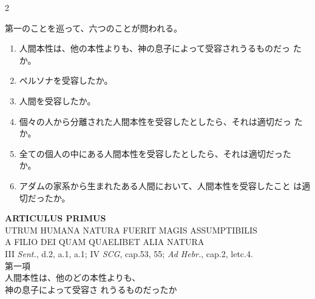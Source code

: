 \documentclass[paper=a4paper,fontsize=10pt,jafontsize=9pt,titlepage]{jlreq}
\begin{document}
\begin{paracol}{2}
\switchcolumn

第一のことを巡って、六つのことが問われる。
\begin{enumerate}
 \item 人間本性は、他の本性よりも、神の息子によって受容されうるものだっ
       たか。
 \item ペルソナを受容したか。
 \item 人間を受容したか。
 \item 個々の人から分離された人間本性を受容したとしたら、それは適切だっ
       たか。
 \item 全ての個人の中にある人間本性を受容したとしたら、それは適切だった
       か。
 \item アダムの家系から生まれたある人間において、人間本性を受容したこと
       は適切だったか。
\end{enumerate}

\end{paracol}

\newpage



{}
\setcounter{section}{1}
\setcounter{subsection}{0}
\begin{center}
 {\Large {\bfseries ARTICULUS PRIMUS}}\\
 {\large UTRUM HUMANA NATURA FUERIT MAGIS ASSUMPTIBILIS\\A FILIO DEI
 QUAM QUAELIBET ALIA NATURA}\\
 {\footnotesize III {\itshape Sent.}, d.2, a.1, a.1; IV {\itshape SCG},
 cap.53, 55; {\itshape Ad Hebr.}, cap.2, letc.4.}\\
 {\Large 第一項\\人間本性は、他のどの本性よりも、\\神の息子によって受容さ
 れうるものだったか}
\end{center}
\end{document}
